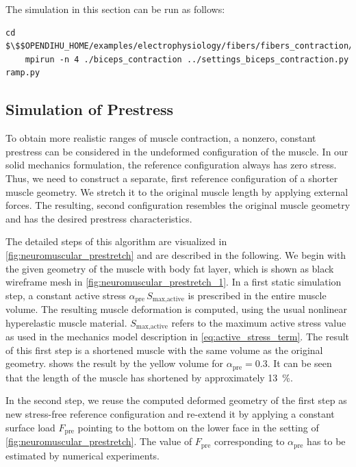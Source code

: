 \begin{reproduce}
  The simulation in this section can be run as follows:
  \begin{lstlisting}[columns=fullflexible,breaklines=true,postbreak=\mbox{\textcolor{gray}{$\hookrightarrow$}\space}]
    cd $\$$OPENDIHU_HOME/examples/electrophysiology/fibers/fibers_contraction/no_precice/build_release
    mpirun -n 4 ./biceps_contraction ../settings_biceps_contraction.py ramp.py
  \end{lstlisting}
\end{reproduce}

\subsection{Simulation of Prestress}\label{sec:prestress_contraction}

To obtain more realistic ranges of muscle contraction, a nonzero, constant prestress can be considered in the undeformed configuration of the muscle. 
In our solid mechanics formulation, the reference configuration always has zero stress. Thus, we need to construct a separate, first reference configuration of a shorter muscle geometry. We stretch it to the original muscle length by applying external forces. The resulting, second configuration resembles the original muscle geometry and has the desired prestress characteristics.

The detailed steps of this algorithm are visualized in \cref{fig:neuromuscular_prestretch} and are described in the following.
We begin with the given geometry of the muscle with body fat layer, which is shown as black wireframe mesh in \cref{fig:neuromuscular_prestretch_1}. In a first static simulation step, a constant active stress $\alpha_\text{pre}\,S_\text{max,active}$ is prescribed in the entire muscle volume. The resulting muscle deformation is computed, using the usual nonlinear hyperelastic muscle material. $S_\text{max,active}$ refers to the maximum active stress value as used in the mechanics model description in \cref{eq:active_stress_term}. The result of this first step is a shortened muscle with the same volume as the original geometry.  shows the result by the yellow volume for $\alpha_\text{pre}=0.3$. It can be seen that the length of the muscle has shortened by approximately \SI{13}{\percent}.

In the second step, we reuse the computed deformed geometry of the first step as new stress-free reference configuration and re-extend it by applying a constant surface load $F_\text{pre}$ pointing to the bottom on the lower face in the setting of \cref{fig:neuromuscular_prestretch}. The value of $F_\text{pre}$ corresponding to $\alpha_\text{pre}$ has to be estimated by numerical experiments.

